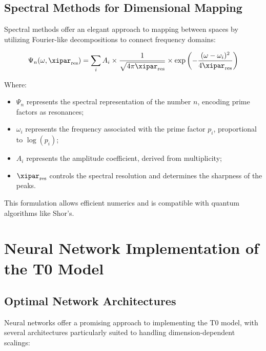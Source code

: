 	\subsection{Spectral Methods for Dimensional Mapping}
	\label{subsec:spectral_methods}
	
	Spectral methods offer an elegant approach to mapping between spaces by utilizing Fourier-like decompositions to connect frequency domains:
	
	\begin{equation}
		\Psi_n(\omega, \xipar_{\text{res}}) = \sum_i A_i \times \frac{1}{\sqrt{4\pi\xipar_{\text{res}}}} \times \exp\left(-\frac{(\omega-\omega_i)^2}{4\xipar_{\text{res}}}\right)
	\end{equation}
	
	Where:
	\begin{itemize}
		\item $\Psi_n$ represents the spectral representation of the number $n$, encoding prime factors as resonances;
		\item $\omega_i$ represents the frequency associated with the prime factor $p_i$, proportional to $\log(p_i)$;
		\item $A_i$ represents the amplitude coefficient, derived from multiplicity;
		\item $\xipar_{\text{res}}$ controls the spectral resolution and determines the sharpness of the peaks.
	\end{itemize}
	
	This formulation allows efficient numerics and is compatible with quantum algorithms like Shor's.
	
	\section{Neural Network Implementation of the T0 Model}
	\label{sec:neural_network}
	
	\subsection{Optimal Network Architectures}
	\label{subsec:optimal_architectures}
	
	Neural networks offer a promising approach to implementing the T0 model, with several architectures particularly suited to handling dimension-dependent scalings:
	
